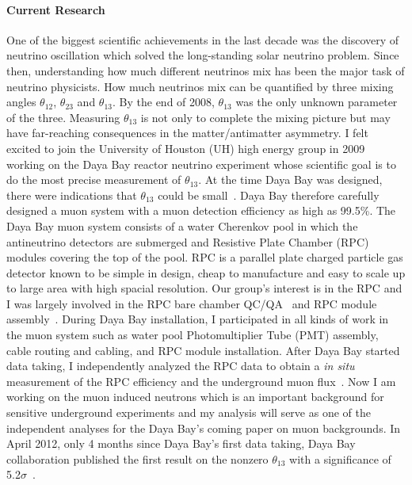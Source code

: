 \documentclass[11pt]{article}
\begin{document}
\paragraph*{Current Research}

One of the biggest scientific achievements in the last decade was the discovery of neutrino oscillation which solved the long-standing solar neutrino problem. Since then, understanding how much different neutrinos mix has been the major task of neutrino physicists. How much neutrinos mix can be quantified by three mixing angles $\theta_{12}$, $\theta_{23}$ and $\theta_{13}$. By the end of 2008, $\theta_{13}$ was the only unknown parameter of the three. Measuring $\theta_{13}$ is not only to complete the mixing picture but may have far-reaching consequences in the matter/antimatter asymmetry. I felt excited to join the University of Houston (UH) high energy group in 2009 working on the Daya Bay reactor neutrino experiment whose scientific goal is to do the most precise measurement of $\theta_{13}$. At the time Daya Bay was designed, there were indications that $\theta_{13}$ could be small~\cite{CHOOZ1998}. Daya Bay therefore carefully designed a muon system with a muon detection efficiency as high as 99.5\%. The Daya Bay muon system consists of a water Cherenkov pool in which the antineutrino detectors are submerged and Resistive Plate Chamber (RPC) modules covering the top of the pool. RPC is a parallel plate charged particle gas detector known to be simple in design, cheap to manufacture and easy to scale up to large area with high spacial resolution. Our group's interest is in the RPC and I was largely involved in the RPC bare chamber QC/QA~\cite{LHM2011} and RPC module assembly~\cite{JLX2011}. During Daya Bay installation, I participated in all kinds of work in the muon system such as water pool Photomultiplier Tube (PMT) assembly, cable routing and cabling, and RPC module installation. After Daya Bay started data taking, I independently analyzed the RPC data to obtain a \textit{in situ} measurement of the RPC efficiency and the underground muon flux~\cite{ZN2013}. Now I am working on the muon induced neutrons which is an important background for sensitive underground experiments and my analysis will serve as one of the independent analyses for the Daya Bay's coming paper on muon backgrounds. In April 2012, only 4 months since Daya Bay's first data taking, Daya Bay collaboration published the first result on the nonzero $\theta_{13}$ with a significance of 5.2$\sigma$~\cite{DYB2012}.
\end{document}
